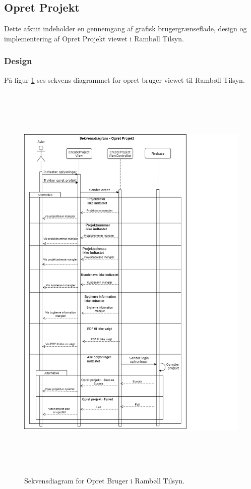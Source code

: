 \subsection{Opret Projekt}\label{sec:Opretprojekt}
Dette afsnit indeholder en gennemgang af grafisk brugergrænseflade, design og implementering af Opret Projekt viewet i Rambøll Tilsyn.

\subsubsection{Design}
På figur \ref{fig:OpretProjektSekvens} ses sekvens diagrammet for opret bruger viewet til Rambøll Tilsyn.
\begin{figure}[H] %
	\centering
	\includegraphics[height=20cm, width=15cm]{../ArkitekturDesign/Design/OpretProjekt/OpretProjektSekvensDiagram}
	\caption{Sekvensdiagram for Opret Bruger i Rambøll Tilsyn.}
	\label{fig:OpretProjektSekvens}
\end{figure}

